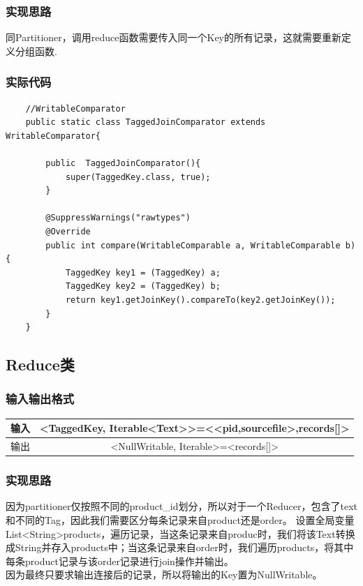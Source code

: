 \documentclass{article}
\begin{document}
\subsubsection{实现思路}
同Partitioner，调用reduce函数需要传入同一个Key的所有记录，这就需要重新定义分组函数.

\subsubsection{实际代码}
\begin{lstlisting}
	//WritableComparator
	public static class TaggedJoinComparator extends WritableComparator{
		
		public  TaggedJoinComparator(){
			super(TaggedKey.class, true);
		}
		
		@SuppressWarnings("rawtypes")
		@Override
		public int compare(WritableComparable a, WritableComparable b){
			TaggedKey key1 = (TaggedKey) a;
			TaggedKey key2 = (TaggedKey) b;
			return key1.getJoinKey().compareTo(key2.getJoinKey());
		}
	}
\end{lstlisting}

\subsection{Reduce类}

\subsubsection{输入输出格式}

\begin{table}[htbp]
	\centering
	\begin{tabular}{cc}
		\toprule    输入 & <TaggedKey, Iterable<Text>>=<<pid,sourcefile>,records[]> \\
		\midrule   输出 & <NullWritable, Iterable>=<records[]> \\ 
		\bottomrule   
	\end{tabular}  
\end{table}

\subsubsection{实现思路}
因为partitioner仅按照不同的product\_id划分，所以对于一个Reducer，包含了text和不同的Tag，因此我们需要区分每条记录来自product还是order。
设置全局变量List<String>products，遍历记录，当这条记录来自produc时，我们将该Text转换成String并存入products中；当这条记录来自order时，我们遍历products，将其中每条product记录与该order记录进行join操作并输出。\\
因为最终只要求输出连接后的记录，所以将输出的Key置为NullWritable。
\end{document}
